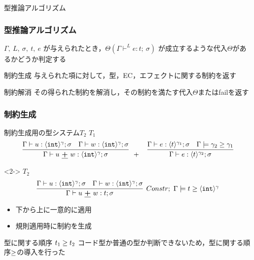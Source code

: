 \begin{frame}
  \center
  \huge{型推論アルゴリズム}
\end{frame}

\begin{frame}
  \frametitle{型推論アルゴリズム}

  $\Gamma,~ L,~ \sigma,~ t,~ e$ が与えられたとき，$\Theta(\Gamma \vdash^{L} e : t ;~\sigma)$ が成立するような代入$\Theta$があるかどうか判定する

  \begin{exampleblock}{制約生成}
    与えられた項に対して，型，EC，エフェクトに関する制約を返す
  \end{exampleblock}
  \begin{exampleblock}{制約解消}
    その得られた制約を解消し，その制約を満たす代入$\Theta$またはfailを返す
  \end{exampleblock}
\end{frame}



\begin{frame}
  \frametitle{制約生成}
  \begin{exampleblock}{制約生成用の型システム$T_2$}
    \small
    $T_1$
    \vspace{-0.5zh}
    \[
      \infer[]
      {\Gamma \vdash u~ \cPlus~ w: \codeT{\intT}{\gamma}; \sigma}
      {\Gamma \vdash u: \codeT{\intT}{\gamma}; \sigma & \Gamma \vdash w: \codeT{\intT}{\gamma}; \sigma}
      +
      \quad
      \infer
      {\Gamma \vdash e : \codeT{t}{\gamma_2} ; \sigma}
      {\Gamma \vdash e : \codeT{t}{\gamma_1} ; \sigma
        & \Gamma \models \gamma_2 \ord \gamma_1
      }
    \]
    \vspace{-2zh}
    \begin{visibleenv}<2->
      $T_2$\\
      \[
        \infer[Constr;~ \Gamma \models \longer{t}{\codeT{\intT}{\gamma}}]
        {\Gamma \vdash u~ \cPlus~ w: t; \sigma}
        {\Gamma \vdash u: \codeT{\intT}{\gamma}; \sigma & \Gamma \vdash w: \codeT{\intT}{\gamma}; \sigma}
      \]
    \end{visibleenv}
    \vspace{-2zh}
    \begin{itemize}
    \item 下から上に一意的に適用
    \item 規則適用時に制約を生成
    \end{itemize}
  \end{exampleblock}
  \begin{exampleblock}{型に関する順序 ${t_1} \ge {t_2}$}
    コード型か普通の型か判断できないため，型に関する順序$\ge$の導入を行った
  \end{exampleblock}
\end{frame}

